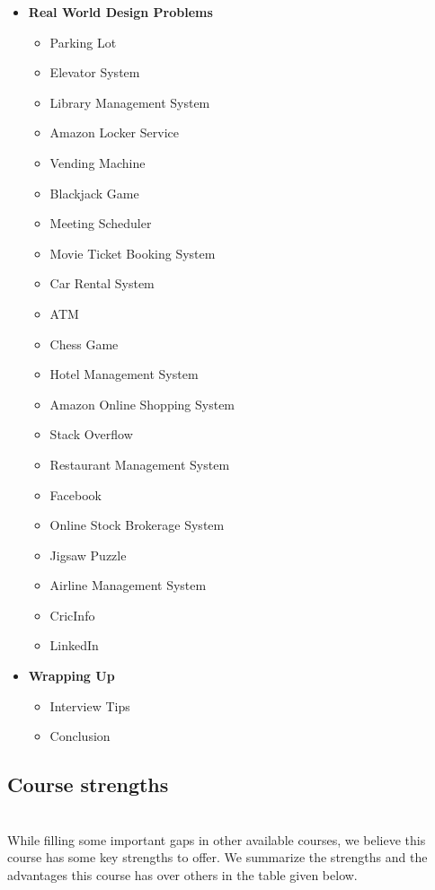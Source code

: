 \begin{itemize}
\begin{itemize}
        \item \textbf{Real World Design Problems}
        \begin{itemize}
            \item Parking Lot
            \item Elevator System
            \item Library Management System
            \item Amazon Locker Service
            \item Vending Machine
            \item Blackjack Game
            \item Meeting Scheduler
            \item Movie Ticket Booking System
            \item Car Rental System
            \item ATM
            \item Chess Game
            \item Hotel Management System
            \item Amazon Online Shopping System
            \item Stack Overflow
            \item Restaurant Management System
            \item Facebook
            \item Online Stock Brokerage System
            \item Jigsaw Puzzle
            \item Airline Management System
            \item CricInfo
            \item LinkedIn
        \end{itemize}
        
        \item \textbf{Wrapping Up}
        \begin{itemize}
            \item Interview Tips
            \item Conclusion
        \end{itemize}
    \end{itemize}
\end{itemize}



\subsection{Course strengths}\label{course-strengths}
\\
While filling some important gaps in other available courses, we believe this course has some key strengths to offer. We summarize the strengths and the advantages this course has over others in the table given below.

